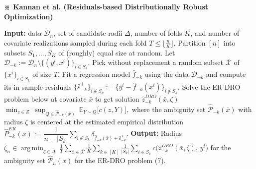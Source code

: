 \documentclass[10pt,a4paper]{article}
\DeclareMathOperator*{\argmin}{arg\,min}
\DeclareMathOperator*{\argmin}{arg\,min}
\begin{document}
\begin{framed}
\textbf{※ Kannan et al. (Residuals-based Distributionally Robust Optimization)}

\setcounter{algorithm}{1}
\begin{algorithm}[H]
\caption{Specifying a covariate-independent radius $\zeta_n$ using the ER-DRO problem}
\begin{algorithmic}[1]
\State \textbf{Input:} data $\mathcal{D}_n$, set of candidate radii $\Delta$, number of folds $K$, and number of covariate realizations sampled during each fold $T\le\lfloor \tfrac{n}{K}\rfloor$.
\State Partition $[n]$ into subsets $S_1,\dots,S_K$ of (roughly) equal size at random. Let $\mathcal{D}_{-k}:=\mathcal{D}_n\setminus\{(y^i,x^i)\}_{i\in S_k}$.
  \State Pick without replacement a random subset $\bar{\mathcal{X}}$ of $\{x^i\}_{i\in S_k}$ of size $T$.
    \For{$\zeta\in\Delta$}
      \State Fit a regression model $\hat f_{-k}$ using the data $\mathcal{D}_{-k}$ and compute its in-sample residuals $\{\hat\varepsilon^{\,i}_{-k}\}_{i\notin S_k}:=\{y^i-\hat f_{-k}(x^i)\}_{i\notin S_k}$.
      \State Solve the ER-DRO problem below at covariate $\bar x$ to get solution $\hat z^{DRO}_{-k}(\bar x,\zeta)$
      \Statex \hspace{\algorithmicindent}\hspace{\algorithmicindent}\hspace{\algorithmicindent}
        $\displaystyle \min_{z\in Z}\ \sup_{Q\in\hat{\mathcal{P}}_{-k}(\bar x)}\ \mathbb{E}_{Y\sim Q}\big[c(z,Y)\big],$
      \Statex \hspace{\algorithmicindent}\hspace{\algorithmicindent}\hspace{\algorithmicindent}
        where the ambiguity set $\hat{\mathcal{P}}_{-k}(\bar x)$ with radius $\zeta$ is centered at the estimated empirical distribution
        $\hat P^{ER}_{-k}(\bar x):=\dfrac{1}{n-|S_k|}\displaystyle\sum_{i\notin S_k}\delta_{\hat f_{-k}(\bar x)+\hat\varepsilon^{\,i}_{-k}}$.
    \EndFor
  \EndFor
\EndFor
\State \textbf{Output:} Radius $\zeta_n\in\displaystyle\argmin_{\zeta\in\Delta}\ \frac{1}{T}\sum_{\bar x\in\bar{\mathcal{X}}}\frac{1}{K}\sum_{k\in[K]}\frac{1}{|S_k|}\sum_{i\in S_k} c\big(\hat z^{DRO}_{-k}(\bar x,\zeta),\,y^i\big)$ for the ambiguity set $\hat{\mathcal{P}}_n(x)$ for the ER-DRO problem (7).
\end{algorithmic}
\end{algorithm}


\end{framed}
\end{document}
